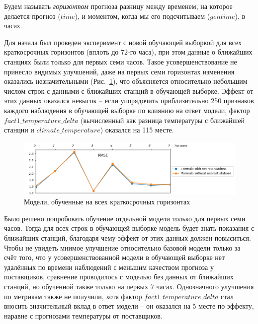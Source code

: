\documentclass[14pt]{matmex-diploma}
\begin{document}
Будем называть \textit{горизонтом} прогноза разницу между временем, на которое делается прогноз ($time$), и моментом, когда мы его подсчитываем ($gentime$), в часах.

Для начала был проведен эксперимент с новой обучающей выборкой для всех краткосрочных горизонтов (вплоть до 72-го часа), при этом данные о ближайших станциях были только для первых семи часов. Такое усовершенствование не принесло видимых улучшений, даже на первых семи горизонтах изменения оказались незначительными (Рис.~\ref{pic1_metrics_initial}), что объясняется относительно небольшим числом строк с данными с ближайших станций в обучающей выборке. Эффект от этих данных оказался невысок -- если упорядочить приблизительно 250 признаков каждого наблюдения в обучающей выборке по влиянию на ответ модели, фактор $fact1\_temperature\_delta$ (вычисленный как разница температуры с ближайшей станции и $climate\_temperature$) оказался на 115 месте.

\begin{figure}
\centering
\includegraphics[width=\linewidth]{images/pic1_metrics_initial.png}
\caption{Модели, обученные на всех краткосрочных горизонтах}
\label{pic1_metrics_initial}
\end{figure}


Было решено попробовать обучение отдельной модели только для первых семи часов. Тогда для всех строк в обучающей выборке модель будет знать показания с ближайших станций, благодаря чему эффект от этих данных должен повыситься. Чтобы не увидеть мнимое улучшение относительно базовой модели только за счёт того, что у усовершенствованной модели в обучающей выборке нет удалённых по времени наблюдений с меньшим качеством прогноза у поставщиков, сравнение проводилось с моделью без данных от ближайших станций, но обученной также только на первых 7 часах. Однозначного улучшения по метрикам также не получили, хотя фактор $fact1\_temperature\_delta$ стал вносить значительный вклад в ответ модели -- он оказался на 5 месте по эффекту, наравне с прогнозами температуры от поставщиков.
\end{document}
